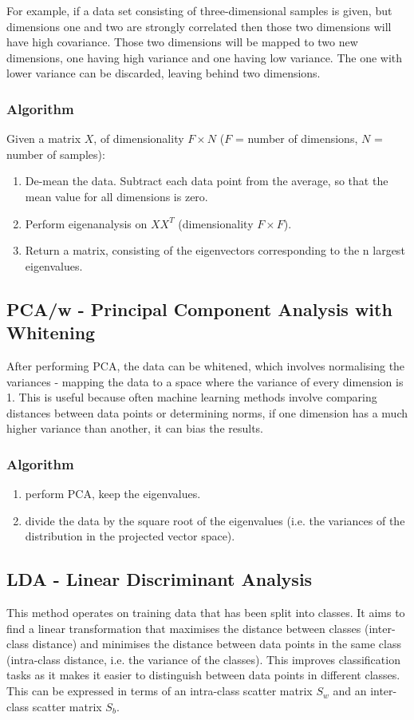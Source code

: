 \documentclass[12pt]{article} %
\begin{document}
For example, if a data set consisting of three-dimensional samples is given, but dimensions one and two are strongly correlated then those two dimensions will have high covariance. Those two dimensions will be mapped to two new dimensions, one having high variance and one having low variance. The one with lower variance can be discarded, leaving behind two dimensions.

\subsubsection{Algorithm}
Given a matrix \(X\), of dimensionality \(F \times N\) (\(F\) = number of dimensions, \(N\) = number of samples):
\begin{enumerate}
\item De-mean the data. Subtract each data point from the average, so that the mean value for all dimensions is zero.
\item Perform eigenanalysis on \(XX^{T}\) (dimensionality \(F \times F\)).
\item Return a matrix, consisting of the eigenvectors corresponding to the n largest eigenvalues.
\end{enumerate}

\subsection{PCA/w - Principal Component Analysis with Whitening}
After performing PCA, the data can be whitened, which involves normalising the variances - mapping the data to a space where the variance of every dimension is 1. This is useful because often machine learning methods involve comparing distances between data points or determining norms, if one dimension has a much higher variance than another, it can bias the results. 

\subsubsection{Algorithm}
\begin{enumerate}
\item perform PCA, keep the eigenvalues.
\item divide the data by the square root of the eigenvalues (i.e. the variances of the distribution in the projected vector space).
\end{enumerate}


\subsection{LDA - Linear Discriminant Analysis}
This method operates on training data that has been split into classes. It aims to find a linear transformation that maximises the distance between classes (inter-class distance) and minimises the distance between data points in the same class (intra-class distance, i.e. the variance of the classes). This improves classification tasks as it makes it easier to distinguish between data points in different classes. This can be expressed in terms of an intra-class scatter matrix \(S_{w}\) and an inter-class scatter matrix \(S_{b}\).
\end{document}
